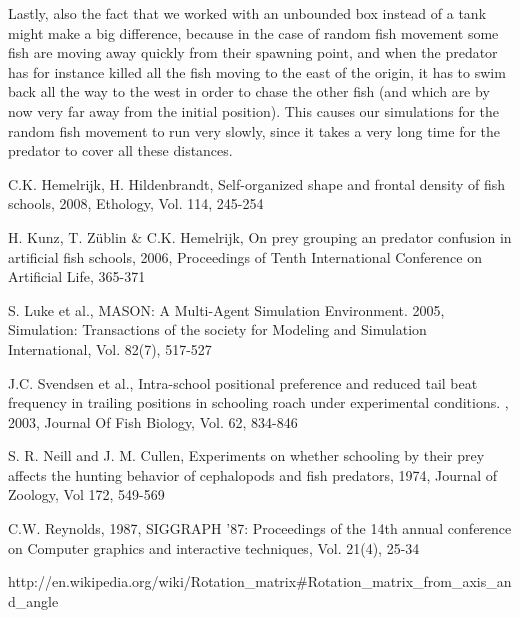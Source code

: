 \documentclass[11pt,a4paper]{article}
\begin{document}
Lastly, also the fact that we worked with an unbounded box instead of a tank might make a big difference, because in the case of random fish movement some fish are moving away quickly from their spawning point, and when the predator has for instance killed all the fish moving to the east of the origin, it has to swim back all the way to the west in order to chase the other fish (and which are by now very far away from the initial position). This causes our simulations for the random fish movement to run very slowly, since it takes a very long time for the predator to cover all these distances.

\begin{thebibliography}{7}
  C.K. Hemelrijk, H. Hildenbrandt, Self-organized shape and frontal density of fish schools, 2008, Ethology, Vol. 114, 245-254

H. Kunz, T. Z\"ublin \& C.K. Hemelrijk, On prey grouping an predator confusion in artificial fish schools, 2006, Proceedings of Tenth International Conference on Artificial Life, 365-371

S. Luke et al., MASON: A Multi-Agent Simulation Environment. 2005, Simulation: Transactions of the society for Modeling and Simulation International, Vol. 82(7), 517-527

J.C. Svendsen et al., Intra-school positional preference and reduced tail beat frequency in trailing positions in schooling roach under experimental conditions. , 2003, Journal Of Fish Biology, Vol. 62, 834-846

S. R. Neill and J. M. Cullen, Experiments on whether schooling by their prey affects the hunting behavior of cephalopods and fish predators, 1974, Journal of Zoology, Vol 172, 549-569

C.W. Reynolds, 1987, SIGGRAPH '87: Proceedings of the 14th annual conference on Computer graphics and interactive techniques, Vol. 21(4), 25-34

  http://en.wikipedia.org/wiki/Rotation\_matrix\#Rotation\_matrix\_from\_axis\_and\_angle

\end{thebibliography}
\end{document}
